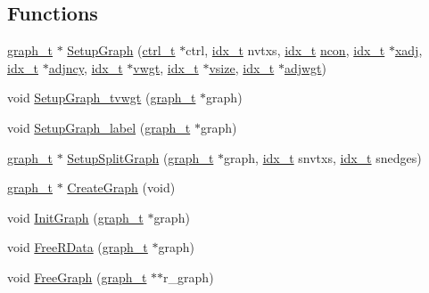 \subsection*{Functions}
\begin{DoxyCompactItemize}
\item 
\hyperlink{a00734}{graph\+\_\+t} $\ast$ \hyperlink{a00849_a9192cba632de98d1759721a5676eaf05}{Setup\+Graph} (\hyperlink{a00742}{ctrl\+\_\+t} $\ast$ctrl, \hyperlink{a00876_aaa5262be3e700770163401acb0150f52}{idx\+\_\+t} nvtxs, \hyperlink{a00876_aaa5262be3e700770163401acb0150f52}{idx\+\_\+t} \hyperlink{a00879_ac1dd31740e8f97fb57dc917ded30253f}{ncon}, \hyperlink{a00876_aaa5262be3e700770163401acb0150f52}{idx\+\_\+t} $\ast$\hyperlink{a00879_aa8fc7f75458e38e1e2979ed6db639164}{xadj}, \hyperlink{a00876_aaa5262be3e700770163401acb0150f52}{idx\+\_\+t} $\ast$\hyperlink{a00879_a20c068e3ebdd8f9889fb82c1f677d679}{adjncy}, \hyperlink{a00876_aaa5262be3e700770163401acb0150f52}{idx\+\_\+t} $\ast$\hyperlink{a00879_a34203f1160d94eca83e95f2718ea3504}{vwgt}, \hyperlink{a00876_aaa5262be3e700770163401acb0150f52}{idx\+\_\+t} $\ast$\hyperlink{a00879_aac32df5bb22250d94fc2fc7e4078308b}{vsize}, \hyperlink{a00876_aaa5262be3e700770163401acb0150f52}{idx\+\_\+t} $\ast$\hyperlink{a00879_a2be4719baa820cfa5c06fd070796e0d3}{adjwgt})
\item 
void \hyperlink{a00849_a274db8b39f4bc294fcb5757b01ae31f1}{Setup\+Graph\+\_\+tvwgt} (\hyperlink{a00734}{graph\+\_\+t} $\ast$graph)
\item 
void \hyperlink{a00849_a6513355a80c360956e3f38816621ae1e}{Setup\+Graph\+\_\+label} (\hyperlink{a00734}{graph\+\_\+t} $\ast$graph)
\item 
\hyperlink{a00734}{graph\+\_\+t} $\ast$ \hyperlink{a00849_ad1dfd83fc2dc5e9f855c2d86b960c809}{Setup\+Split\+Graph} (\hyperlink{a00734}{graph\+\_\+t} $\ast$graph, \hyperlink{a00876_aaa5262be3e700770163401acb0150f52}{idx\+\_\+t} snvtxs, \hyperlink{a00876_aaa5262be3e700770163401acb0150f52}{idx\+\_\+t} snedges)
\item 
\hyperlink{a00734}{graph\+\_\+t} $\ast$ \hyperlink{a00849_a01903fa912de9fc7f01dace993a3fc85}{Create\+Graph} (void)
\item 
void \hyperlink{a00849_af046766ada304a0cf49db44b544810a8}{Init\+Graph} (\hyperlink{a00734}{graph\+\_\+t} $\ast$graph)
\item 
void \hyperlink{a00849_a12a6bda050dc470113f4d1cd5aa5777d}{Free\+R\+Data} (\hyperlink{a00734}{graph\+\_\+t} $\ast$graph)
\item 
void \hyperlink{a00849_a6af2646733e761482dafebbb5e351240}{Free\+Graph} (\hyperlink{a00734}{graph\+\_\+t} $\ast$$\ast$r\+\_\+graph)
\end{DoxyCompactItemize}


